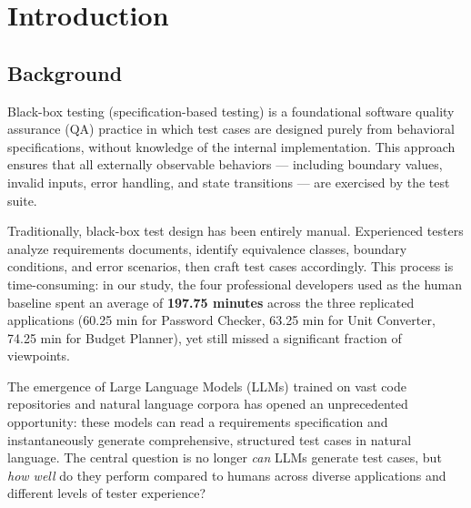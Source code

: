 \documentclass[12pt,a4paper]{article}
\begin{document}
\section{Introduction}

\subsection{Background}
Black-box testing (specification-based testing) is a foundational software quality assurance (QA) practice in which test cases are designed purely from behavioral specifications, without knowledge of the internal implementation. This approach ensures that all externally observable behaviors --- including boundary values, invalid inputs, error handling, and state transitions --- are exercised by the test suite.

Traditionally, black-box test design has been entirely manual. Experienced testers analyze requirements documents, identify equivalence classes, boundary conditions, and error scenarios, then craft test cases accordingly. This process is time-consuming: in our study, the four professional developers used as the human baseline spent an average of \textbf{197.75 minutes} across the three replicated applications (60.25 min for Password Checker, 63.25 min for Unit Converter, 74.25 min for Budget Planner), yet still missed a significant fraction of viewpoints.

The emergence of Large Language Models (LLMs) trained on vast code repositories and natural language corpora has opened an unprecedented opportunity: these models can read a requirements specification and instantaneously generate comprehensive, structured test cases in natural language. The central question is no longer \textit{can} LLMs generate test cases, but \textit{how well} do they perform compared to humans across diverse applications and different levels of tester experience?
\end{document}
